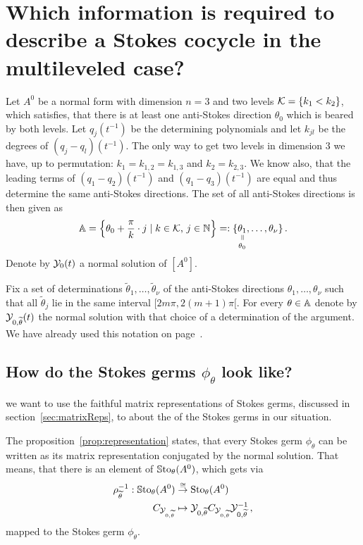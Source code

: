 \section{Which information is required to describe a Stokes cocycle in the
  multileveled case?}
Let $A^0$ be a normal form with dimension $n=3$ and two levels
$\mathcal{K}=\{k_1<k_2\}$, which satisfies, that there is at least one anti-Stokes
direction $\theta_0$ which is beared by both levels.
Let $q_j(t^{-1})$ be the determining polynomials and let $k_{jl}$ be the
degrees of $(q_j-q_l)(t^{-1})$.
The only way to get two levels in dimension $3$ we have, up to permutation:
$k_1=k_{1,2}=k_{1,3}$ and $k_2=k_{2,3}$.
We know also, that the leading terms of $(q_1-q_2)(t^{-1})$ and
$(q_1-q_3)(t^{-1})$ are equal and thus determine the same anti-Stokes
directions.
The set of all anti-Stokes directions is then given as
\[
  \A=\left\{\theta_0+\frac{\pi}{k}\cdot j\mid k\in\cK\text{, }j\in\N\right\}
    =:\{
      \underset{\theta_0}{%
        \underset{\text{\rotatebox[origin=c]{-90}{$=$}}}{%
          \theta_1
      }}
    ,\dots,\theta_\nu\}\,.
\]
Denote by $\mathcal{Y}_0(t)$ a normal solution of $[A^0]$.

Fix a set of determinations $\tilde\theta_1,\dots,\tilde\theta_\nu$ of the
anti-Stokes directions $\theta_1,\dots,\theta_\nu$ such that all
$\tilde\theta_j$ lie in the same interval $[2m\pi,2(m+1)\pi[$.
For every $\theta\in\mathbb{A}$ denote by $\mathcal{Y}_{0,\widetilde\theta}(t)$ the normal solution
with that choice of a determination of the argument. We have already used this
notation on page~\pageref{page:alreadyUsedDefn}.

\subsection{How do the Stokes germs $\phi_\theta$ look like?}
 we want to use the faithful matrix representations of Stokes
germs, discussed in section~\ref{sec:matrixReps}, to  about the  of the Stokes germs in our situation.

The proposition~\ref{prop:representation} states, that every Stokes germ
$\phi_\theta$ can be written as its matrix representation conjugated by the
normal solution. That means, that there is an element of $\operatorname{\mathbb{S}to}_\theta(A^0)$,
which gets via
\begin{align*}
  \rho_{\widetilde\theta}^{-1}:
  \operatorname{\mathbb{S}to}_\theta(A^0)
  &\overset{\cong}\to
  \operatorname{Sto}_\theta(A^0)
  \\C_{\mathcal{Y}_{0,\widetilde\theta}} &\mapsto
  \mathcal{Y}_{0,\widetilde\theta} C_{\mathcal{Y}_{0,\widetilde\theta}} \mathcal{Y}_{0,\widetilde\theta}^{-1} \,,
\end{align*}
mapped to the Stokes germ $\phi_\theta$.

